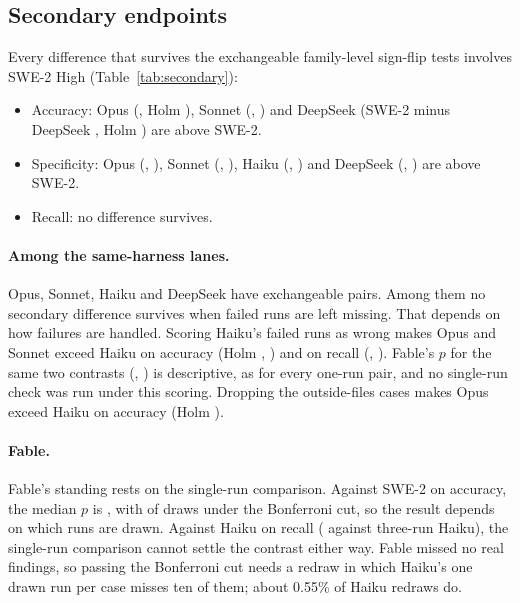 \documentclass[11pt]{article}
\begin{document}
\subsection{Secondary endpoints}

Every difference that survives the exchangeable family-level sign-flip tests involves SWE-2 High (Table~\ref{tab:secondary}):
\begin{itemize}
  \item Accuracy: Opus (, Holm ), Sonnet (, ) and DeepSeek (SWE-2 minus DeepSeek , Holm ) are above SWE-2.
  \item Specificity: Opus (, ), Sonnet (, ), Haiku (, ) and DeepSeek (, ) are above SWE-2.
  \item Recall: no difference survives.
\end{itemize}

\paragraph{Among the same-harness lanes.} Opus, Sonnet, Haiku and DeepSeek have exchangeable pairs. Among them no secondary difference survives when failed runs are left missing. That depends on how failures are handled. Scoring Haiku's  failed runs as wrong makes Opus and Sonnet exceed Haiku on accuracy (Holm , ) and on recall (, ). Fable's $p$ for the same two contrasts (, ) is descriptive, as for every one-run pair, and no single-run check was run under this scoring. Dropping the  outside-files cases makes Opus exceed Haiku on accuracy (Holm ).

\paragraph{Fable.} Fable's standing rests on the single-run comparison. Against SWE-2 on accuracy, the median $p$ is , with  of draws under the Bonferroni cut, so the result depends on which runs are drawn. Against Haiku on recall ( against three-run Haiku), the single-run comparison cannot settle the contrast either way. Fable missed no real findings, so passing the Bonferroni cut needs a redraw in which Haiku's one drawn run per case misses ten of them; about 0.55\% of Haiku redraws do.
\end{document}
